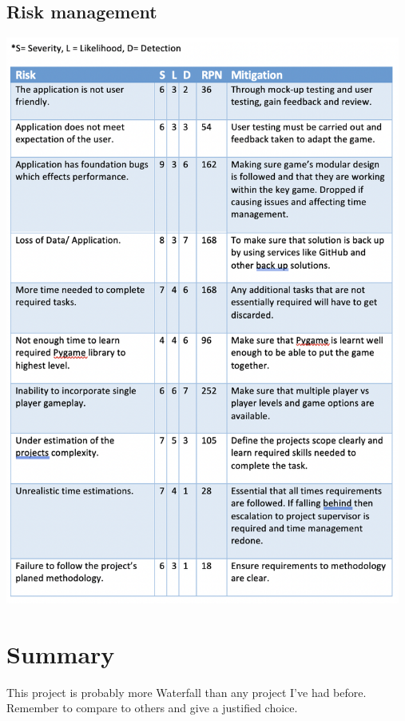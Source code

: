 \documentclass[a4paper,10pt]{article}
\begin{document}
\subsection{Risk management}
\begin{center}
	\item\includegraphics[width=13cm]{riskman.png}
\end{center}

\section{Summary}



This project is probably more Waterfall than any project I've had before. Remember to compare to others and give a justified choice.

\newpage
%	
\end{document}
